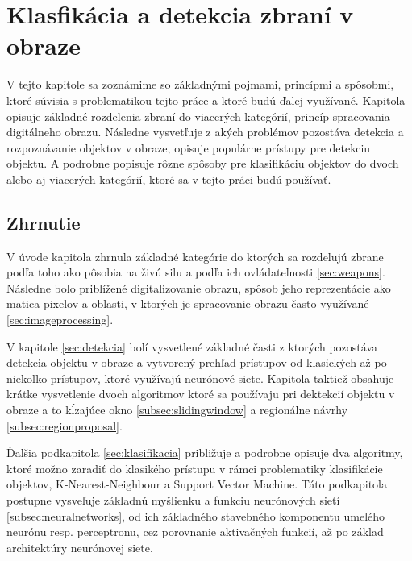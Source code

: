 
\chapter{Klasfikácia a detekcia zbraní v obraze}
\label{chap:technologie}

V tejto kapitole sa zoznámime so základnými pojmami, princípmi a spôsobmi, ktoré súvisia s problematikou tejto práce a ktoré budú ďalej využívané.
Kapitola opisuje základné rozdelenia zbraní do viacerých kategórií, princíp spracovania digitálneho obrazu.
Následne vysvetľuje z akých problémov pozostáva detekcia a rozpoznávanie objektov v obraze, opisuje populárne prístupy pre detekciu objektu.
A podrobne popisuje rôzne spôsoby pre klasifikáciu objektov do dvoch alebo aj viacerých kategórií, ktoré sa v tejto práci budú používať.













\section{Zhrnutie}

V úvode kapitola zhrnula základné kategórie do ktorých sa rozdeľujú zbrane podľa toho ako pôsobia na živú silu a podľa ich ovládateľnosti \ref{sec:weapons}.
Následne bolo priblížené digitalizovanie obrazu, spôsob jeho reprezentácie ako matica pixelov a oblasti, v ktorých je spracovanie obrazu často využívané \ref{sec:imageprocessing}.

V kapitole \ref{sec:detekcia} bolí vysvetlené základné časti z ktorých pozostáva detekcia objektu v obraze a vytvorený prehľad prístupov od
    klasických až po niekoľko prístupov, ktoré využívajú neurónové siete.
Kapitola taktiež obsahuje krátke vysvetlenie dvoch algoritmov ktoré sa používaju pri dektekcií objektu v obraze a to kĺzajúce okno \ref{subsec:slidingwindow} a
    regionálne návrhy \ref{subsec:regionproposal}.

Ďalšia podkapitola \ref{sec:klasifikacia} približuje a podrobne opisuje dva algoritmy, ktoré možno zaradiť do klasikého prístupu v rámci problematiky klasifikácie objektov,
    K-Nearest-Neighbour a Support Vector Machine.
Táto podkapitola postupne vysveľuje základnú myšlienku a funkciu neurónových sietí \ref{subsec:neuralnetworks}, od ich základného stavebného komponentu umelého neurónu resp. perceptronu,
    cez porovnanie aktivačných funkcií, až po základ architektúry neurónovej siete.

